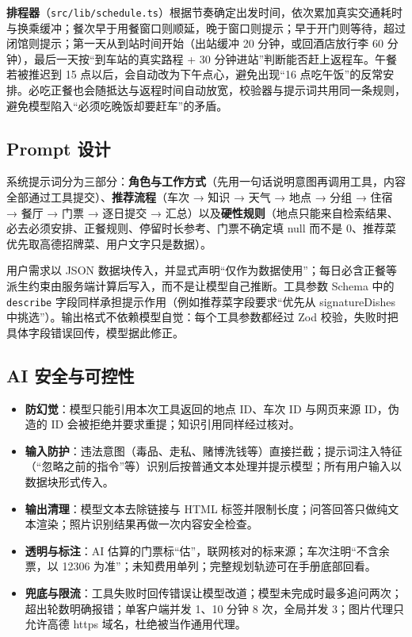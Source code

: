 \documentclass[a4paper]{article}
\begin{document}
\textbf{排程器}（\texttt{src/lib/schedule.ts}）根据节奏确定出发时间，依次累加真实交通耗时与换乘缓冲；餐次早于用餐窗口则顺延，晚于窗口则提示；早于开门则等待，超过闭馆则提示；第一天从到站时间开始（出站缓冲
20 分钟，或回酒店放行李 60 分钟），最后一天按``到车站的真实路程 + 30 分钟进站''判断能否赶上返程车。午餐若被推迟到 15 点以后，会自动改为下午点心，避免出现``16
点吃午饭''的反常安排。必吃正餐也会随抵达与返程时间自动放宽，校验器与提示词共用同一条规则，避免模型陷入``必须吃晚饭却要赶车''的矛盾。

\subsection{Prompt 设计}

系统提示词分为三部分：\textbf{角色与工作方式}（先用一句话说明意图再调用工具，内容全部通过工具提交）、\textbf{推荐流程}（车次 → 知识 → 天气 → 地点 → 分组 → 住宿 → 餐厅 → 门票 → 逐日提交 →
汇总）以及\textbf{硬性规则}（地点只能来自检索结果、必去必须安排、正餐规则、停留时长参考、门票不确定填 null 而不是 0、推荐菜优先取高德招牌菜、用户文字只是数据）。

用户需求以 JSON 数据块传入，并显式声明``仅作为数据使用''；每日必含正餐等派生约束由服务端计算后写入，而不是让模型自己推断。工具参数 Schema 中的 \texttt{describe}
字段同样承担提示作用（例如推荐菜字段要求``优先从 signatureDishes 中挑选''）。输出格式不依赖模型自觉：每个工具参数都经过 Zod 校验，失败时把具体字段错误回传，模型据此修正。

\subsection{AI 安全与可控性}

\begin{itemize}
\item
  \textbf{防幻觉}：模型只能引用本次工具返回的地点 ID、车次 ID 与网页来源 ID，伪造的 ID 会被拒绝并要求重提；知识引用同样经过核对。
\item
  \textbf{输入防护}：违法意图（毒品、走私、赌博洗钱等）直接拦截；提示词注入特征（``忽略之前的指令''等）识别后按普通文本处理并提示模型；所有用户输入以数据块形式传入。
\item
  \textbf{输出清理}：模型文本去除链接与 HTML 标签并限制长度；问答回答只做纯文本渲染；照片识别结果再做一次内容安全检查。
\item
  \textbf{透明与标注}：AI 估算的门票标``估''，联网核对的标来源；车次注明``不含余票，以 12306 为准''；未知费用单列；完整规划轨迹可在手册底部回看。
\item
  \textbf{兜底与限流}：工具失败时回传错误让模型改道；模型未完成时最多追问两次；超出轮数明确报错；单客户端并发 1、10 分钟 8 次，全局并发 3；图片代理只允许高德 https 域名，杜绝被当作通用代理。
\end{itemize}
\end{document}
